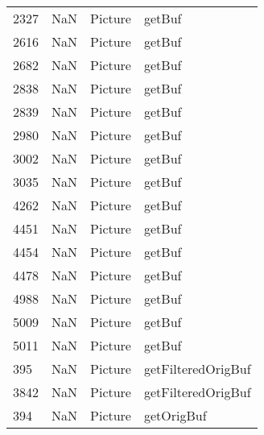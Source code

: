 \begin{tabular}{llll}
2327 &                   NaN &                    Picture &                                    getBuf \\
2616 &                   NaN &                    Picture &                                    getBuf \\
2682 &                   NaN &                    Picture &                                    getBuf \\
2838 &                   NaN &                    Picture &                                    getBuf \\
2839 &                   NaN &                    Picture &                                    getBuf \\
2980 &                   NaN &                    Picture &                                    getBuf \\
3002 &                   NaN &                    Picture &                                    getBuf \\
3035 &                   NaN &                    Picture &                                    getBuf \\
4262 &                   NaN &                    Picture &                                    getBuf \\
4451 &                   NaN &                    Picture &                                    getBuf \\
4454 &                   NaN &                    Picture &                                    getBuf \\
4478 &                   NaN &                    Picture &                                    getBuf \\
4988 &                   NaN &                    Picture &                                    getBuf \\
5009 &                   NaN &                    Picture &                                    getBuf \\
5011 &                   NaN &                    Picture &                                    getBuf \\
395  &                   NaN &                    Picture &                        getFilteredOrigBuf \\
3842 &                   NaN &                    Picture &                        getFilteredOrigBuf \\
394  &                   NaN &                    Picture &                                getOrigBuf \\

\end{tabular}

